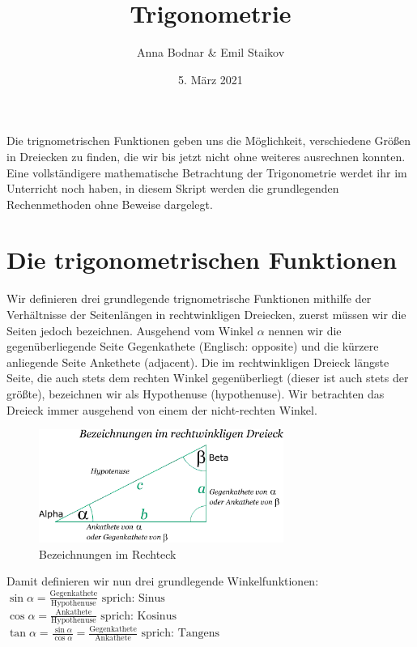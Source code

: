 \documentclass[11pt]{article}
\title{Trigonometrie}
\author{Anna Bodnar \& Emil Staikov}
\date{5. März 2021}
\begin{document}
\maketitle
Die trignometrischen Funktionen geben uns die Möglichkeit, verschiedene Größen in Dreiecken zu finden, die wir bis jetzt nicht ohne weiteres ausrechnen konnten. Eine vollständigere mathematische Betrachtung der Trigonometrie werdet ihr im Unterricht noch haben, in diesem Skript werden die grundlegenden Rechenmethoden ohne Beweise dargelegt. \\

\section{Die trigonometrischen Funktionen}
Wir definieren drei grundlegende trignometrische Funktionen mithilfe der Verhältnisse der Seitenlängen in rechtwinkligen Dreiecken, zuerst müssen wir die Seiten jedoch bezeichnen. Ausgehend vom Winkel $\alpha$ nennen wir die gegenüberliegende Seite Gegenkathete (Englisch: opposite) und die kürzere anliegende Seite Ankethete (adjacent). Die im rechtwinkligen Dreieck längste Seite, die auch stets dem rechten Winkel gegenüberliegt (dieser ist auch stets der größte), bezeichnen wir als Hypothenuse (hypothenuse). Wir betrachten das Dreieck immer ausgehend von einem der nicht-rechten Winkel.   
\begin{figure}[ht]
    \includegraphics[width=8cm]{seiten-im-rechten-dreieck.png}
    \centering
    \caption{Bezeichnungen im Rechteck}
\end{figure} 
Damit definieren wir nun drei grundlegende Winkelfunktionen: \\
$\displaystyle\sin \alpha = \frac{\text{Gegenkathete}}{\text{Hypothenuse}} \text{ sprich: Sinus}$ \\
$\displaystyle\cos \alpha = \frac{\text{Ankathete}}{\text{Hypothenuse}} \text{ sprich: Kosinus}$ \\
$\displaystyle\tan \alpha = \frac{\sin \alpha}{\cos \alpha} = \frac{\text{Gegenkathete}}{\text{Ankathete}} \text{ sprich: Tangens}$ \\\\
\end{document}
